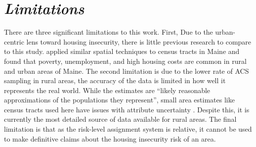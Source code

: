 \section{\textit{Limitations}}

There are three significant limitations to this work. First, Due to the urban-centric lens toward housing insecurity, there is little previous research to compare to this study. \citet{gleason_using_2021} applied similar spatial techniques to census tracts in Maine and found that poverty, unemployment, and high housing costs are common in rural and urban areas of Maine. The second limitation is due to the lower rate of ACS sampling in rural areas, the accuracy of the data is limited in how well it represents the real world. While the estimates are “likely reasonable approximations of the populations they represent”, small area estimates like census tracts used here have issues with attribute uncertainty \citep{spielman_patterns_2014}. Despite this, it is currently the most detailed source of data available for rural areas. The final limitation is that as the risk-level assignment system is relative, it cannot be used to make definitive claims about the housing insecurity risk of an area.  

\endinput